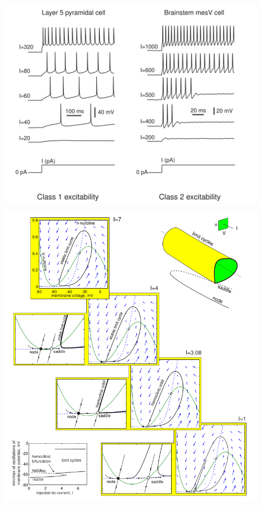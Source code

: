 \documentclass[aspectratio=169]{beamer}
\begin{document}
\begin{frame}[plain]
\begin{center}
\includegraphics[height=1.4\textheight]{./excitability_classes.png}
\end{center}

\end{frame}
\begin{frame}[plain]
\begin{center}
\includegraphics[height=1.4\textheight]{./homoclinic.png}
\end{center}
\end{frame}
\end{document}
